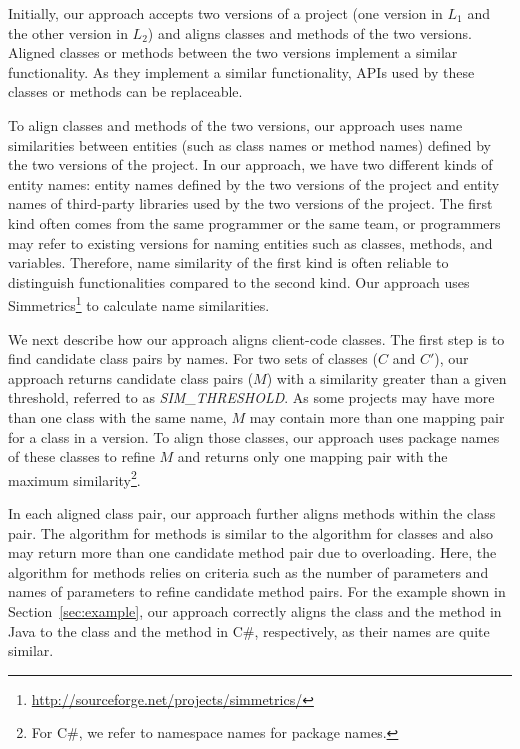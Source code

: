 Initially, our approach accepts two versions of a project (one version in
$L_1$ and the other version in $L_2$) and aligns classes and methods
of the two versions. Aligned classes or methods
between the two versions implement a similar functionality. As they
implement a similar functionality, APIs used by these classes or methods can be
replaceable.

To align classes and methods of the two versions, our approach uses
name similarities between entities (such as class names or method
names) defined by the two versions of the project. In our approach,
we have two different kinds of entity names: entity names defined by
the two versions of the project and entity names of third-party
libraries used by the two versions of the project. The first kind
often comes from the same programmer or the same team, or
programmers may refer to existing versions for naming entities such
as classes, methods, and variables. Therefore, name similarity of
the first kind is often reliable to distinguish functionalities
compared to the second kind. Our approach uses
Simmetrics\footnote{\url{http://sourceforge.net/projects/simmetrics/}}
to calculate name similarities.

We next describe how our approach aligns client-code classes. 
The first step is to find candidate class pairs by names. For two sets
of classes ($C$ and $C'$), our approach returns candidate class
pairs ($M$) with a similarity greater than a given threshold,
referred to as \emph{SIM\_THRESHOLD}. As some projects may have more
than one class with the same name, $M$ may contain more than one
mapping pair for a class in a version. To align those classes, our
approach uses package names of these classes to refine $M$ and
returns only one mapping pair with the maximum
similarity\footnote{For C\#, we refer to namespace names for package
names.}.

In each aligned class pair, our approach further aligns methods
within the class pair. The algorithm for methods is similar to the
algorithm for classes and also may return more than one candidate
method pair due to overloading. Here, the algorithm for methods
relies on criteria such as the number of parameters and names of
parameters to refine candidate method pairs. For the example shown
in Section~\ref{sec:example}, our approach correctly aligns the
class  and the method  in Java to
the class  and the method  in C\#,
respectively, as their names are quite similar.
